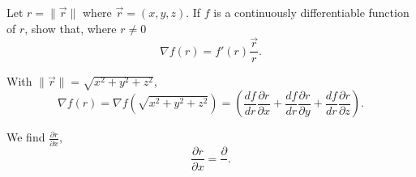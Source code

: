 \documentclass{article}
\begin{document}
  \begin{problem}
    Let $r=\|\vec{r}\|$ where $\vec{r}=(x,y,z)$. If $f$ is a continuously differentiable function of $r$, show that, where $r\neq0$ \[
    \nabla f(r)=f'(r)\frac{\vec{r}}{r}
    .\] 
  \end{problem}

  With $\|\vec{r}\|=\sqrt{x^{2}+y^{2}+z^{2}}$, \[
  \nabla f(r)=\nabla f\left(\sqrt{x^{2}+y^{2}+z^{2}}\right)=\left(\frac{df}{dr}\frac{\partial r}{\partial x}+\frac{df}{dr}\frac{\partial r}{\partial y}+\frac{df}{dr}\frac{\partial r}{\partial z}\right)
  .\] 

  We find $\frac{\partial r}{\partial x}$, \[
  \frac{\partial r}{\partial x}=\frac{\partial}{}
  .\] 
\end{document}
